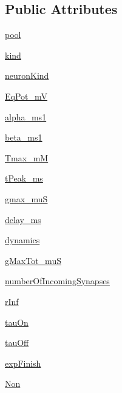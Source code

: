 \subsection*{Public Attributes}
\begin{DoxyCompactItemize}
\item 
\hyperlink{class_synapse_1_1_synapse_a133990bf3ab7f1efa8b416be73d07a11}{pool}
\item 
\hyperlink{class_synapse_1_1_synapse_aa2ea45450a3ad13cfefcae9fabe6ce15}{kind}
\item 
\hyperlink{class_synapse_1_1_synapse_a031af2fe7be76f9b5f69c087228a1b9a}{neuron\-Kind}
\item 
\hyperlink{class_synapse_1_1_synapse_adc80e9a62c17b29a92c2e7a0413e572d}{Eq\-Pot\-\_\-m\-V}
\item 
\hyperlink{class_synapse_1_1_synapse_ae15502cd5d5604d38328b2b1432477d7}{alpha\-\_\-ms1}
\item 
\hyperlink{class_synapse_1_1_synapse_ab59f413cbd21555531be209dee307a97}{beta\-\_\-ms1}
\item 
\hyperlink{class_synapse_1_1_synapse_ae4bcd698c5be77c2a6629d511d75f046}{Tmax\-\_\-m\-M}
\item 
\hyperlink{class_synapse_1_1_synapse_a09b9b092efcb0d6745fa32fadcd46375}{t\-Peak\-\_\-ms}
\item 
\hyperlink{class_synapse_1_1_synapse_a7922dac4765183cb6052905cc0d251cb}{gmax\-\_\-mu\-S}
\item 
\hyperlink{class_synapse_1_1_synapse_a14adfda48133bd314f4dcd65fc9a2366}{delay\-\_\-ms}
\item 
\hyperlink{class_synapse_1_1_synapse_a67a1454de1ef2f08ffa3a10bf8466158}{dynamics}
\item 
\hyperlink{class_synapse_1_1_synapse_a470750725ecb176e048a973b9dc23ea3}{g\-Max\-Tot\-\_\-mu\-S}
\item 
\hyperlink{class_synapse_1_1_synapse_a6e55e008336cc47551669f3d77248d57}{number\-Of\-Incoming\-Synapses}
\item 
\hyperlink{class_synapse_1_1_synapse_afd263d49a97910efd8955a2aadef50e0}{r\-Inf}
\item 
\hyperlink{class_synapse_1_1_synapse_aae46f8edd1e94ea2ab51e3612afd3a3f}{tau\-On}
\item 
\hyperlink{class_synapse_1_1_synapse_afd5638a223c3fdcc672002dbced7bed0}{tau\-Off}
\item 
\hyperlink{class_synapse_1_1_synapse_aa9ae256b272ceb8e9e4a931a9cd5d163}{exp\-Finish}
\item 
\hyperlink{class_synapse_1_1_synapse_af8779bbc2ee2c5ae7747ee5cfbcf112e}{Non}

\end{DoxyCompactItemize}
